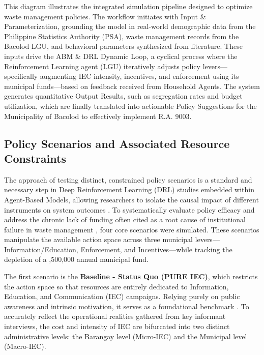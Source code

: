 This diagram illustrates the integrated simulation pipeline designed to optimize waste management policies. The workflow initiates with Input \& Parameterization, grounding the model in real-world demographic data from the Philippine Statistics Authority (PSA), waste management records from the Bacolod LGU, and behavioral parameters synthesized from literature. These inputs drive the ABM \& DRL Dynamic Loop, a cyclical process where the Reinforcement Learning agent (LGU) iteratively adjusts policy levers—specifically augmenting IEC intensity, incentives, and enforcement using its municipal funds—based on feedback received from Household Agents. The system generates quantitative Output Results, such as segregation rates and budget utilization, which are finally translated into actionable Policy Suggestions for the Municipality of Bacolod to effectively implement R.A. 9003.
\subsection{Policy Scenarios and Associated Resource Constraints}

The approach of testing distinct, constrained policy scenarios is a standard and necessary step in Deep Reinforcement Learning (DRL) studies embedded within Agent-Based Models, allowing researchers to isolate the causal impact of different instruments on system outcomes \citep{Jimenez2025, TianReview2024}. To systematically evaluate policy efficacy and address the chronic lack of funding often cited as a root cause of institutional failure in waste management \citep{Ibanez2022, Santos2025}, four core scenarios were simulated. These scenarios manipulate the available action space across three municipal levers—Information/Education, Enforcement, and Incentives—while tracking the depletion of a ,500,000 annual municipal fund.

The first scenario is the \textbf{Baseline - Status Quo (PURE IEC)}, which restricts the action space so that resources are entirely dedicated to Information, Education, and Communication (IEC) campaigns. Relying purely on public awareness and intrinsic motivation, it serves as a foundational benchmark \citep{Collado2024}. To accurately reflect the operational realities gathered from key informant interviews, the cost and intensity of IEC are bifurcated into two distinct administrative levels: the Barangay level (Micro-IEC) and the Municipal level (Macro-IEC).

